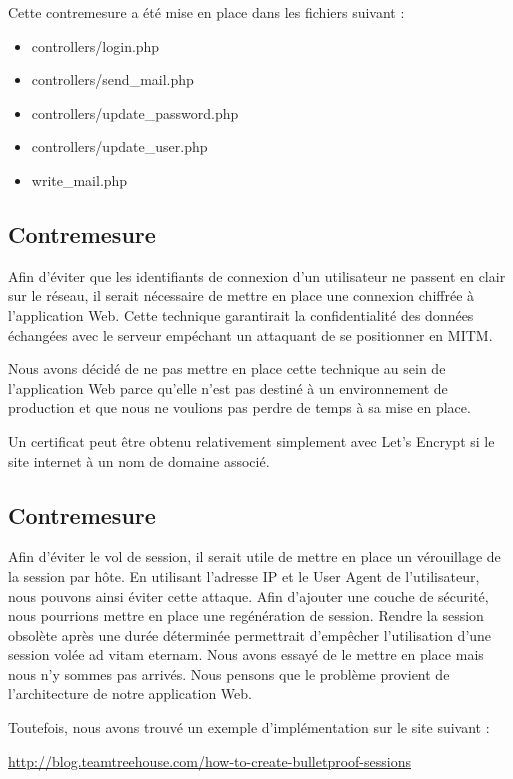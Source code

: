 \documentclass[12pt]{article}
\begin{document}
Cette contremesure a été mise en place dans les fichiers suivant :

\begin{itemize}
\item controllers/login.php
\item controllers/send\_mail.php
\item controllers/update\_password.php
\item controllers/update\_user.php
\item write\_mail.php
\end{itemize}

\newpage
\subsection{Contremesure}\label{c8}

Afin d'éviter que les identifiants de connexion d'un utilisateur ne passent en clair sur le réseau, il serait nécessaire de mettre en place une connexion chiffrée à l'application Web. Cette technique garantirait la confidentialité des données échangées avec le serveur empéchant un attaquant de se positionner en MITM.

Nous avons décidé de ne pas mettre en place cette technique au sein de l'application Web parce qu'elle n'est pas destiné à un environnement de production et que nous ne voulions pas perdre de temps à sa mise en place.

Un certificat peut être obtenu relativement simplement avec Let's Encrypt si le site internet à un nom de domaine associé.

\subsection{Contremesure}\label{c9}

Afin d'éviter le vol de session, il serait utile de mettre en place un vérouillage de la session par hôte. En utilisant l'adresse IP et le User Agent de l'utilisateur, nous pouvons ainsi éviter cette attaque. Afin d'ajouter une couche de sécurité, nous pourrions mettre en place une regénération de session. Rendre la session obsolète après une durée déterminée permettrait d'empêcher l'utilisation d'une session volée ad vitam eternam.
Nous avons essayé de le mettre en place mais nous n'y sommes pas arrivés. Nous pensons que le problème provient de l'architecture de notre application Web. 

Toutefois, nous avons trouvé un exemple d'implémentation sur le site suivant :

\url{http://blog.teamtreehouse.com/how-to-create-bulletproof-sessions}
\end{document}
